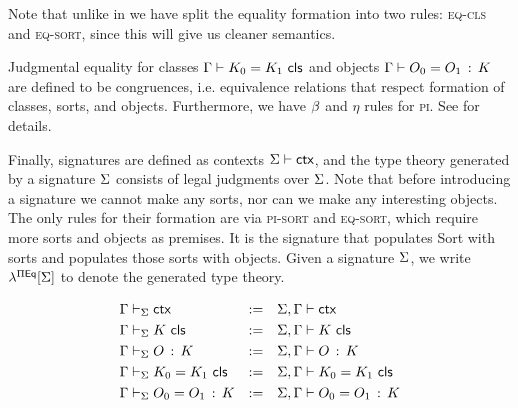 Note that unlike in \cite{harper2021equational} we have split the equality formation into two rules:
\textsc{eq-cls} and \textsc{eq-sort},
since this will give us cleaner semantics.


Judgmental equality for classes $\Gamma \vdash K_{0} = K_{1} \,\, \mathsf{cls}$ and objects
$\Gamma \vdash O_{0} = O_{1} \, : \, K$ are defined to be congruences,
i.e. equivalence relations that respect formation of classes,
sorts, and objects.
Furthermore, we have $\beta$ and $\eta$ rules for \textsc{pi}.
See \cite{harper2021equational} for details. %

Finally, signatures are defined as contexts $\Sigma \vdash \mathsf{ctx}$,
and the type theory generated by a signature $\Sigma$ consists of
legal judgments over $\Sigma$.
Note that before introducing a signature we cannot make any sorts,
nor can we make any interesting objects.
The only rules for their formation are via \textsc{pi-sort} and \textsc{eq-sort},
which require more sorts and objects as premises.
It is the signature that populates \textsf{Sort} with sorts
and populates those sorts with objects.
Given a signature $\Sigma$, we write $\lambda^{\Pi \mathsf{Eq}}[\Sigma]$ to denote the
generated type theory.

\begin{align*}
  &\Gamma \vdash_\Sigma \mathsf{ctx} & :=
  & & & \Sigma,\Gamma \vdash \mathsf{ctx} \\
  &\Gamma \vdash_\Sigma K \,\, \mathsf{cls} & :=
  & & & \Sigma,\Gamma \vdash K \,\, \mathsf{cls} \\
  &\Gamma \vdash_\Sigma O \, : \, K & :=
  & & & \Sigma,\Gamma \vdash O \, : \, K \\
  &\Gamma \vdash_\Sigma K_{0} = K_{1} \,\, \mathsf{cls} & :=
  & & & \Sigma,\Gamma \vdash K_{0} = K_{1} \,\, \mathsf{cls} \\
  &\Gamma \vdash_\Sigma O_{0} = O_{1} \, : \, K & :=
  & & & \Sigma,\Gamma \vdash O_{0} = O_{1} \, : \, K
\end{align*}
